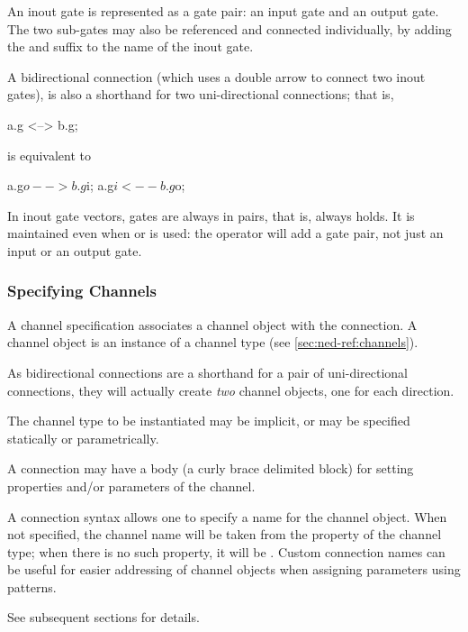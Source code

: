 {An inout gate is represented as a gate pair: an input gate and an output gate.
The two sub-gates may also be referenced and connected individually, by adding
the  and  suffix to the name of the inout gate.

A bidirectional connection (which uses a double arrow to connect two inout gates),
is also a shorthand for two uni-directional connections; that is,

\begin{ned}
a.g <--> b.g;
\end{ned}

is equivalent to
\begin{ned}
a.g$o --> b.g$i;
a.g$i <-- b.g$o;
\end{ned}

In inout gate vectors, gates are always in pairs, that is,
 always holds. It is maintained even
when  or  is used: the \ttt{++} operator will
add a gate pair, not just an input or an output gate.


\subsubsection{Specifying Channels}
\label{sec:ned-ref:specifying-channels}

A channel specification associates a channel object with the connection.
A channel object is an instance of a channel type (see \ref{sec:ned-ref:channels}).

\begin{note}
As bidirectional connections are a shorthand for a pair of uni-directional
connections, they will actually create \textit{two} channel objects, one
for each direction.
\end{note}

The channel type to be instantiated may be implicit, or may be specified
statically or parametrically.

A connection may have a body (a curly brace delimited block) for setting
properties and/or parameters of the channel.

A connection syntax allows one to specify a name for the channel object.
When not specified, the channel name will be taken from the 
property of the channel type; when there is no such property, it will be
. Custom connection names can be useful for easier addressing of
channel objects when assigning parameters using patterns.

See subsequent sections for details.


}
